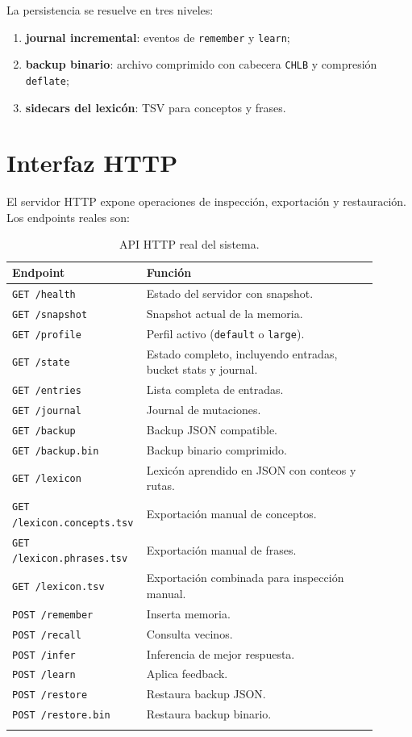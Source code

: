 \documentclass[11pt]{article}
\begin{document}
La persistencia se resuelve en tres niveles:
\begin{enumerate}
  \item \textbf{journal incremental}: eventos de \texttt{remember} y \texttt{learn};
  \item \textbf{backup binario}: archivo comprimido con cabecera \texttt{CHLB} y compresión \texttt{deflate};
  \item \textbf{sidecars del lexicón}: TSV para conceptos y frases.
\end{enumerate}

\section{Interfaz HTTP}

El servidor HTTP expone operaciones de inspección, exportación y restauración. Los endpoints reales son:

\begin{longtable}{p{0.28\linewidth}p{0.62\linewidth}}
\toprule
\textbf{Endpoint} & \textbf{Función} \\
\midrule
\texttt{GET /health} & Estado del servidor con snapshot. \\
\texttt{GET /snapshot} & Snapshot actual de la memoria. \\
\texttt{GET /profile} & Perfil activo (\texttt{default} o \texttt{large}). \\
\texttt{GET /state} & Estado completo, incluyendo entradas, bucket stats y journal. \\
\texttt{GET /entries} & Lista completa de entradas. \\
\texttt{GET /journal} & Journal de mutaciones. \\
\texttt{GET /backup} & Backup JSON compatible. \\
\texttt{GET /backup.bin} & Backup binario comprimido. \\
\texttt{GET /lexicon} & Lexicón aprendido en JSON con conteos y rutas. \\
\texttt{GET /lexicon.concepts.tsv} & Exportación manual de conceptos. \\
\texttt{GET /lexicon.phrases.tsv} & Exportación manual de frases. \\
\texttt{GET /lexicon.tsv} & Exportación combinada para inspección manual. \\
\texttt{POST /remember} & Inserta memoria. \\
\texttt{POST /recall} & Consulta vecinos. \\
\texttt{POST /infer} & Inferencia de mejor respuesta. \\
\texttt{POST /learn} & Aplica feedback. \\
\texttt{POST /restore} & Restaura backup JSON. \\
\texttt{POST /restore.bin} & Restaura backup binario. \\
\bottomrule
\caption{API HTTP real del sistema.}
\end{longtable}
\end{document}
